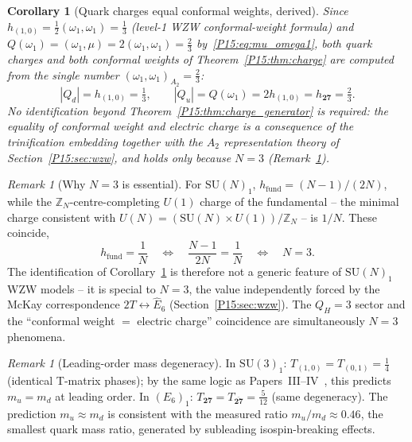 \documentclass[11pt,a4paper]{article}
\newtheorem{corollary}[theorem]{Corollary}
\theoremstyle{definition}\newtheorem{definition}[theorem]{Definition}
\theoremstyle{remark}
\newtheorem{remark}[theorem]{Remark}
\newcommand{\SU}{\mathrm{SU}}
\newcommand{\twoT}{2T}
\newcommand{\QH}{Q_H}
\begin{document}
\begin{corollary}[Quark charges equal conformal weights, derived]
\label{P15:cor:charge_eq_weight}
Since $h_{(1,0)}=\tfrac12(\omega_1,\omega_1)=\tfrac13$
(level-1 WZW conformal-weight formula) and
$Q(\omega_1)=(\omega_1,\mu)=2(\omega_1,\omega_1)=\tfrac23$
by~\eqref{P15:eq:mu_omega1}, both quark charges and both conformal
weights of Theorem~\ref{P15:thm:charge} are computed from the single
number $(\omega_1,\omega_1)_{A_2}=\tfrac23$:
\begin{equation}
  \boxed{|Q_d| = h_{(1,0)} = \tfrac13,
  \qquad
  |Q_u| = Q(\omega_1) = 2h_{(1,0)} = h_{\mathbf{27}} = \tfrac23.}
  \label{P15:eq:charge_eq_weight}
\end{equation}
No identification beyond Theorem~\ref{P15:thm:charge_generator} is
required: the equality of conformal weight and electric charge is
a consequence of the trinification embedding together with the
$A_2$ representation theory of Section~\ref{P15:sec:wzw}, and holds
only because $N=3$ (Remark~\ref{P15:rem:N3_unique}).
\end{corollary}

\begin{remark}[Why $N=3$ is essential]
\label{P15:rem:N3_unique}
For $\SU(N)_1$, $h_{\mathrm{fund}}=(N-1)/(2N)$, while the
$\mathbb{Z}_N$-centre-completing $U(1)$ charge of the fundamental
-- the minimal charge consistent with
$U(N)=(\SU(N)\times U(1))/\mathbb{Z}_N$ -- is $1/N$. These coincide,
\begin{equation}
  h_{\mathrm{fund}} = \frac{1}{N}
  \quad\Longleftrightarrow\quad
  \frac{N-1}{2N}=\frac{1}{N}
  \quad\Longleftrightarrow\quad
  N=3.
  \label{P15:eq:N3unique}
\end{equation}
The identification of Corollary~\ref{P15:cor:charge_eq_weight} is
therefore not a generic feature of $\SU(N)_1$ WZW models -- it is
special to $N=3$, the value independently forced by the McKay
correspondence $\twoT\leftrightarrow\widehat{E}_6$
(Section~\ref{P15:sec:wzw}). The $\QH=3$ sector and the
``conformal weight $=$ electric charge'' coincidence are
simultaneously $N=3$ phenomena.
\end{remark}

\begin{remark}[Leading-order mass degeneracy]
\label{P15:rem:leading_order_mass_degeneracy}
In $\SU(3)_1$: $T_{(1,0)}=T_{(0,1)}=\tfrac{1}{4}$ (identical
T-matrix phases); by the same logic as Papers~III--IV~\cite{Paper3,Paper4},
this predicts $m_u=m_d$ at leading order.
In $(E_6)_1$: $T_{\mathbf{27}}=T_{\overline{\mathbf{27}}}=\tfrac{5}{12}$
(same degeneracy).
The prediction $m_u\approx m_d$ is consistent with the measured
ratio $m_u/m_d\approx0.46$, the smallest quark mass ratio,
generated by subleading isospin-breaking effects.
\end{remark}
\end{document}
